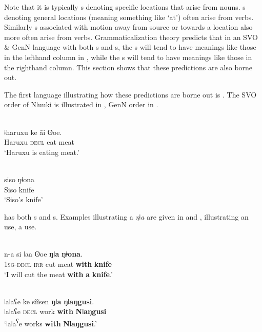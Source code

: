 \documentclass[output=paper]{langsci/langscibook}
\begin{document}
Note that it is typically s denoting specific locations that arise from nouns. s denoting general locations (meaning something like ‘at’) often arise from verbs. Similarly s associated with motion away from source or towards a location also more often arise from verbs. Grammaticalization theory predicts that in an SVO \& GenN language with both s and s, the s will tend to have meanings like those in the lefthand column in , while the s will tend to have meanings like those in the righthand column. This section shows that these predictions are also borne out.

The first language illustrating how these predictions are borne out is . The SVO order of Nǀuuki is illustrated in , GenN order in .

\ea\label{ex:dryer:11}
\\
\gll ǂharuxu    ke  ãi  ʘoe.\\
       Haruxu  \textsc{decl}  eat  meat \\
\glt ‘Haruxu is eating meat.’  
\z

\ea\label{ex:dryer:12}
\\
\gll siso  ŋǂona\\
       Siso  knife\\
\glt   ‘Siso’s knife’
\z

\noindent {} has both s and s. Examples illustrating a  \textit{ŋ}ǀ\textit{a} are given in  and ,  illustrating an  use,  a  use.

\ea\label{ex:dryer:13}
\\
\gll n-a  si  ǀaa  ʘoe  \textbf{ŋǀa}  \textbf{ŋǂona}.\\
       1\textsc{sg-decl}  \textsc{irr}  cut  meat  \textbf{with}  \textbf{knife}  \\
\glt ‘I will cut the meat \textbf{with} \textbf{a} \textbf{knife}.’  
\z

\ea\label{ex:dryer:14}
\\
\gll ǀaǀaʕe  ke  sĩĩsen  \textbf{ŋǀa} \textbf{ŋǀaŋgusi}.\\
       ǀaǀaʕe  \textsc{decl}  work  \textbf{with}  \textbf{Nǀaŋgusi}  \\
\glt ‘ǀaǀa\textsuperscript{ʕ}e works \textbf{with} \textbf{Nǀaŋgusi}.’  
\z
\end{document}
